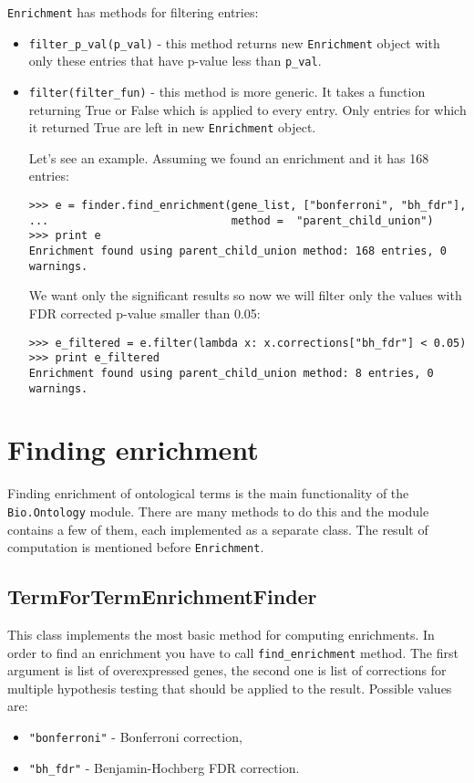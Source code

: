 \verb|Enrichment| has methods for filtering entries:
\begin{itemize}
\item \verb|filter_p_val(p_val)| - this method returns new \verb|Enrichment|
object with only these entries that have p-value less than \verb|p_val|.

\item \verb|filter(filter_fun)| - this method is more generic. It takes
a function returning True or False which is applied to every entry. Only entries
for which it returned True are left in new \verb|Enrichment| object.

Let's see an example. Assuming we found an enrichment and it has 168 entries:
\begin{verbatim}
>>> e = finder.find_enrichment(gene_list, ["bonferroni", "bh_fdr"],
...                            method =  "parent_child_union")
>>> print e
Enrichment found using parent_child_union method: 168 entries, 0 warnings.
\end{verbatim}
We want only the significant results so now we will filter only the values
with FDR corrected p-value smaller than 0.05:
\begin{verbatim}
>>> e_filtered = e.filter(lambda x: x.corrections["bh_fdr"] < 0.05)
>>> print e_filtered
Enrichment found using parent_child_union method: 8 entries, 0 warnings.
\end{verbatim}

\end{itemize}

\section{Finding enrichment}
Finding enrichment of ontological terms is the main
functionality of the \verb|Bio.Ontology|
module. There are many methods to do this and the module contains a
few of them, each implemented as a separate class. The result of
computation is mentioned before \verb|Enrichment|.

\subsection{TermForTermEnrichmentFinder}
This class implements the most basic method for computing
enrichments.
In order to find an enrichment you have to call \verb|find_enrichment| method.
The first argument is list of overexpressed genes, the second one is list of
corrections for multiple hypothesis testing that should be applied to the
result. Possible values are:
\begin{itemize}
\item \verb|"bonferroni"| - Bonferroni correction,
\item \verb|"bh_fdr"| - Benjamin-Hochberg FDR correction.
\end{itemize}

